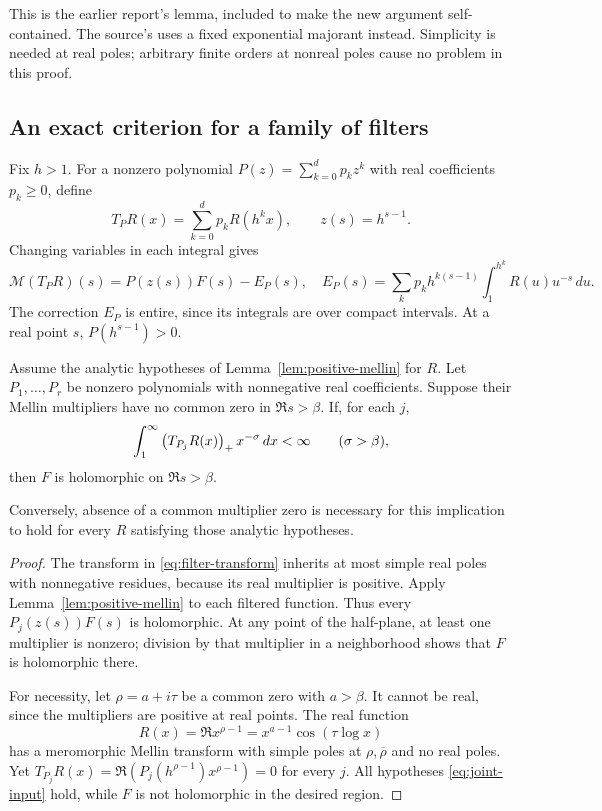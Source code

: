 This is the earlier report's lemma, included to make the new argument self-contained. The source's
uses a fixed exponential majorant instead. Simplicity is needed at real poles; arbitrary finite orders at nonreal poles cause no problem in this proof.

\subsection{An exact criterion for a family of filters}

Fix $h>1$. For a nonzero polynomial $P(z)=\sum_{k=0}^d p_kz^k$ with real coefficients $p_k\ge0$, define
\[
 T_PR(x)=\sum_{k=0}^d p_kR(h^kx),\qquad z(s)=h^{s-1}.
\]
Changing variables in each integral gives
\begin{equation}\label{eq:filter-transform}
 \mathcal M(T_PR)(s)=P(z(s))F(s)-E_P(s),
 \quad
 E_P(s)=\sum_k p_kh^{k(s-1)}\int_1^{h^k}R(u)u^{-s}\,du.
\end{equation}
The correction $E_P$ is entire, since its integrals are over compact intervals. At a real point $s$, $P(h^{s-1})>0$.

\begin{theorem}\label{thm:joint-detection}
Assume the analytic hypotheses of Lemma~\ref{lem:positive-mellin} for $R$. Let $P_1,\ldots,P_r$ be nonzero polynomials with nonnegative real coefficients. Suppose their Mellin multipliers have no common zero in $\Re s>\beta$. If, for each $j$,
\begin{equation}\label{eq:joint-input}
 \int_1^\infty\left(T_{P_j}R(x)\right)_{+}x^{-\sigma}\,dx<\infty
 \qquad(\sigma>\beta),
\end{equation}
then $F$ is holomorphic on $\Re s>\beta$.

Conversely, absence of a common multiplier zero is necessary for this implication to hold for every $R$ satisfying those analytic hypotheses.
\end{theorem}

\begin{proof}
The transform in \eqref{eq:filter-transform} inherits at most simple real poles with nonnegative residues, because its real multiplier is positive. Apply Lemma~\ref{lem:positive-mellin} to each filtered function. Thus every $P_j(z(s))F(s)$ is holomorphic. At any point of the half-plane, at least one multiplier is nonzero; division by that multiplier in a neighborhood shows that $F$ is holomorphic there.

For necessity, let $\rho=a+i\tau$ be a common zero with $a>\beta$. It cannot be real, since the multipliers are positive at real points. The real function
\[
 R(x)=\Re x^{\rho-1}=x^{a-1}\cos(\tau\log x)
\]
has a meromorphic Mellin transform with simple poles at $\rho,\overline\rho$ and no real poles. Yet
$T_{P_j}R(x)=\Re(P_j(h^{\rho-1})x^{\rho-1})=0$ for every $j$. All hypotheses \eqref{eq:joint-input} hold, while $F$ is not holomorphic in the desired region.
\end{proof}

